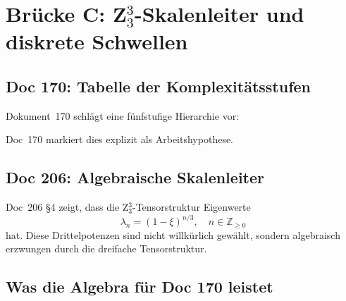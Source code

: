 \section{\texorpdfstring{Brücke C: Z$_3^3$-Skalenleiter und diskrete Schwellen}{Brücke C: Z3-hoch-3-Skalenleiter und diskrete Schwellen}}\label{sec:brueckeC}

\subsection{Doc 170: Tabelle der Komplexitätsstufen}

Dokument~170 schlägt eine fünfstufige Hierarchie vor:

\begin{center}
\end{center}

Doc~170 markiert dies explizit als Arbeitshypothese.

\subsection{Doc 206: Algebraische Skalenleiter}

Doc~206 \S4 zeigt, dass die Z$_3^3$-Tensorstruktur Eigenwerte
\[
\lambda_n = (1-\xi)^{n/3}, \quad n \in \mathbb{Z}_{\geq 0}
\]
hat. Diese Drittelpotenzen sind nicht willkürlich gewählt, sondern algebraisch erzwungen durch die dreifache Tensorstruktur.

\subsection{Was die Algebra für Doc 170 leistet}

